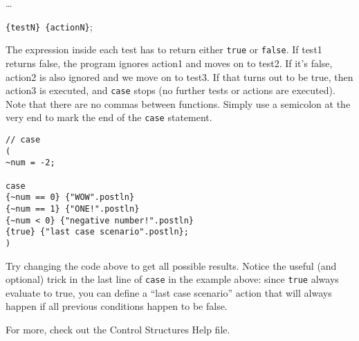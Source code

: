 \dots

\texttt{\{testN\} \{actionN\}};

The expression inside each test has to return either \texttt{true} or \texttt{false}. If test1 returns false, the program ignores action1 and moves on to test2. If it's false, action2 is also ignored and we move on to test3. If that turns out to be true, then action3 is executed, and \texttt{case} stops (no further tests or actions are executed). Note that there are no commas between functions. Simply use a semicolon at the very end to mark the end of the \texttt{case} statement.

 
\begin{lstlisting}[style=SuperCollider-IDE, basicstyle=\scttfamily\footnotesize]
// case
(
~num = -2;

case
{~num == 0} {"WOW".postln}
{~num == 1} {"ONE!".postln}
{~num < 0} {"negative number!".postln}
{true} {"last case scenario".postln};
)
\end{lstlisting}
 
Try changing the code above to get all possible results. Notice the useful (and optional) trick in the last line of \texttt{case} in the example above: since \texttt{true} always evaluate to true, you can define a ``last case scenario'' action that will always happen if all previous conditions happen to be false.

For more, check out the Control Structures Help file.